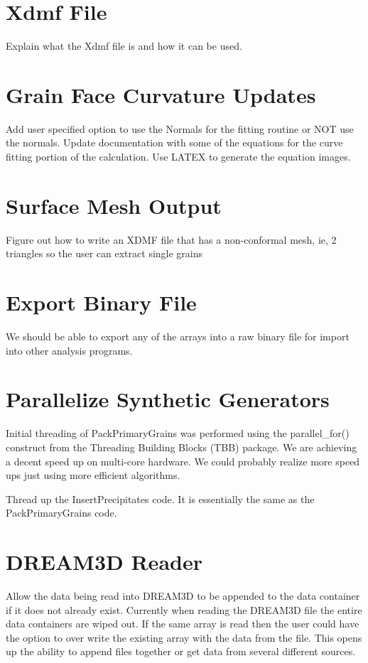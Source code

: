 \documentclass[12pt]{article} %
\begin{document}
\section{Xdmf File}
  Explain what the Xdmf file is and how it can be used.

\section{Grain Face Curvature Updates}
	Add user specified option to use the Normals for the fitting routine or NOT use the normals. Update documentation with some of the equations for the curve fitting portion of the calculation. Use LATEX to generate the equation images.

\section{Surface Mesh Output}
	Figure out how to write an XDMF file that has a non-conformal mesh, ie, 2 triangles so the user can extract single grains

\section{Export Binary File}
  We should be able to export any of the arrays into a raw binary file for import into other analysis programs. 
  
\section{Parallelize Synthetic Generators}
   Initial threading of PackPrimaryGrains was performed using the parallel\_for() construct from the Threading Building Blocks (TBB) package. We are achieving a decent speed up on multi-core hardware. We could probably realize more speed ups just using more efficient algorithms.
   
   Thread up the InsertPrecipitates code. It is essentially the same as the PackPrimaryGrains code.

\section{DREAM3D Reader}
 Allow the data being read into DREAM3D to be appended to the data container if it does not already exist. Currently when reading the DREAM3D file the entire data containers are wiped out. If the same array is read then the user could have the option to over write the existing array with the data from the file. This opens up the ability to append files together or get data from several different sources.  
 
\end{document}
